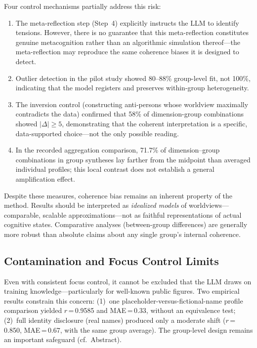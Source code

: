 \documentclass[11pt,a4paper]{article}
\begin{document}
Four control mechanisms partially address this risk:
\begin{enumerate}[nosep]
  \item The meta-reflection step (Step~4) explicitly instructs the LLM to identify tensions. However, there is no guarantee that this meta-reflection constitutes genuine metacognition rather than an algorithmic simulation thereof---the meta-reflection may reproduce the same coherence biases it is designed to detect.
  \item Outlier detection in the pilot study showed 80--88\% group-level fit, not 100\%, indicating that the model registers and preserves within-group heterogeneity.
  \item The inversion control (constructing anti-persons whose worldview maximally contradicts the data) confirmed that 58\% of dimension-group combinations showed $|\Delta| \geq 5$, demonstrating that the coherent interpretation is a specific, data-supported choice---not the only possible reading.
  \item In the recorded aggregation comparison, 71.7\% of dimension--group combinations in group syntheses lay farther from the midpoint than averaged individual profiles; this local contrast does not establish a general amplification effect.
\end{enumerate}

Despite these measures, coherence bias remains an inherent property of the method. Results should be interpreted as \emph{idealized models} of worldviews---comparable, scalable approximations---not as faithful representations of actual cognitive states. Comparative analyses (between-group differences) are generally more robust than absolute claims about any single group's internal coherence.


\subsection{Contamination and Focus Control Limits}
\label{sec:limitations:contamination}

Even with consistent focus control, it cannot be excluded that the LLM draws on training knowledge---particularly for well-known public figures. Two empirical results constrain this concern: (1)~one placeholder-versus-fictional-name profile comparison yielded $r$\,=\,0.9585 and MAE\,=\,0.33, without an equivalence test; (2)~full identity disclosure (real names) produced only a moderate shift ($r$\,=\,0.850, MAE\,=\,0.67, with the same group average). The group-level design remains an important safeguard (cf.\ Abstract).
\end{document}
